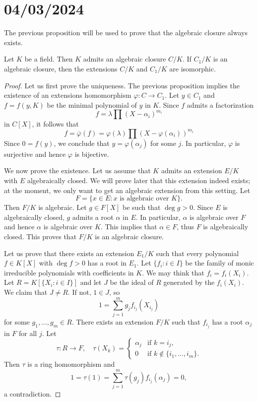 \section{04/03/2024}

The previous proposition will be used to prove 
that the algebraic closure always exists. 

\begin{theorem}[Artin]
	Let $K$ be a field. Then $K$ admits an algebraic closure $C/K$. If $C_1/K$
	is an algebraic closure, then the extensions $C/K$ and $C_1/K$ are
	isomorphic. 
\end{theorem}

\begin{proof}
    Let us first prove the uniqueness. The previous proposition implies the existence of 
    an extensions homomorphism $\varphi\colon C\to C_1$. Let $y\in C_1$ and $f=f(y,K)$ be 
    the minimal polynomial of $y$ in $K$. Since $f$ admits a factorization
    \[
        f=\lambda\prod (X-\alpha_i)^{m_i}
    \]
    in $C[X]$, it follows that
    \[
    f=\overline{\varphi}(f)=\varphi(\lambda)\prod (X-\varphi(\alpha_i))^{m_i}
    \]
    Since $0=f(y)$, we conclude that $y=\varphi(\alpha_j)$ for some $j$. In particular, $\varphi$ is
    surjective and hence $\varphi$ is bijective. 
    
    We now prove the existence. Let us assume that $K$ admits an extension $E/K$ 
    with $E$ algebraically closed. We will prove later that this extension indeed exists; at the moment,
    we only want to get an algebraic extension from this setting. Let 
    \[
    	F=\{x\in E:x\text{ is algebraic over }K\}. 
    \]
    Then $F/K$ is algebraic. Let $g\in F[X]$ be such that
    $\deg g>0$. Since $E$ is algebraically closed, $g$ admits a root $\alpha$ in $E$. In particular, $\alpha$
    is algebraic over $F$ and hence $\alpha$ is algebraic over $K$. This implies that $\alpha\in F$, thus
    $F$ is algebraically closed. This proves that $F/K$ is an algebraic closure. 
    
    Let us prove that there exists an extension $E_1/K$ such that
    every polynomial $f\in K[X]$ with $\deg f>0$ has a root in $E_1$. Let 
    $\{f_i:i\in I\}$ be the family of monic irreducible polynomials with coefficients in $K$. 
    We may think that $f_i=f_i(X_i)$. 
    Let $R=K[\{X_i:i\in I\}]$ and let $J$ be the ideal of $R$ 
    generated by the $f_i(X_i)$. We claim that $J\ne R$. If not, $1\in J$, so
    \[
    1=\sum_{j=1}^m g_jf_{i_j}(X_{i_j})
    \]
    for some $g_1,\dots,g_m\in R$. There exists an extension $F/K$ such that
    $f_{i_j}$ has a root $\alpha_j$ in $F$ for all $j$. Let 
    \[
    \tau\colon R\to F,\quad
    \tau(X_k)=\begin{cases}
        \alpha_j & \text{if $k=i_j$},\\
        0 & \text{if $k\not\in\{i_1,\dots,i_m\}$}.
        \end{cases}
    \]
    Then $\tau$ is a ring homomorphism and 
    \[
    1=\tau(1)=\sum_{j=1}^m\tau(g_j)f_{i_j}(\alpha_{j})=0,
    \]
    a contradiction. 
    

\end{proof}
